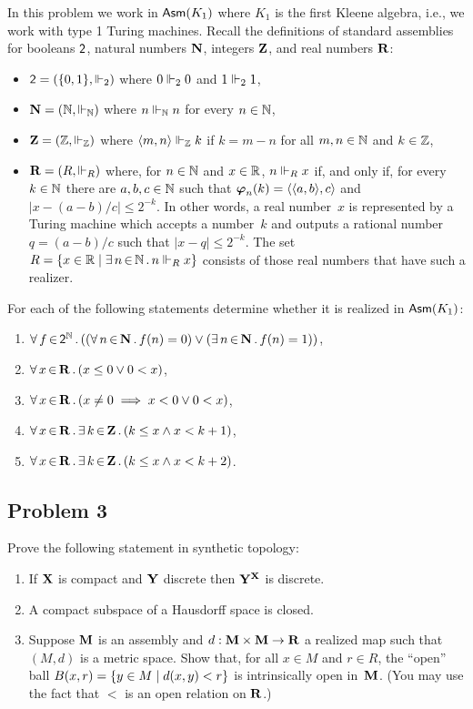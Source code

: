 \documentclass[a4paper,11pt]{article}
\begin{document}
In this problem we work in $\mathsf{Asm}(K_1)$ where $K_1$ is the first Kleene
algebra, i.e., we work with type 1 Turing machines. Recall the
definitions of standard assemblies for booleans $\mathsf{2}$, natural
numbers $\mathbf{N}$, integers $\mathbf{Z}$, and real numbers $\mathbf{R}$:
%
\begin{itemize}
\item $\mathsf{2} = (\{0,1\}, {\Vdash_2})$ where $0 \Vdash_2 0$ and
  $1 \Vdash_2 1$,
\item $\mathbf{N} = (\mathbb{N}, {\Vdash_{\mathbb{N}}})$ where $n \Vdash_{\mathbb{N}} n$ for every $n
  \in \mathbb{N}$,
\item $\mathbf{Z} = (\mathbb{Z}, {\Vdash_{\mathbb{Z}}})$ where $\langle m,n \rangle \Vdash_{\mathbb{Z}} k$ if $k
  = m - n$ for all $m, n \in \mathbb{N}$ and $k \in \mathbb{Z}$,
\item $\mathbf{R} = (R, {\Vdash_R})$ where, for $n \in \mathbb{N}$ and $x \in \mathbb{R}$,
  $n \Vdash_R x$ if, and only if, for every $k \in \mathbb{N}$ there are $a, b,
  c \in \mathbb{N}$ such that $\text{\boldmath{$\varphi$}}_{n}(k) = \langle \langle a, b \rangle, c \rangle$ and $|x -
  (a - b)/c| \leq 2^{-k}$. In other words, a real number~$x$ is
  represented by a Turing machine which accepts a number~$k$ and
  outputs a rational number $q = (a-b)/c$ such that $|x - q| \leq
  2^{-k}$. The set $R = \{x \in \mathbb{R} \mid \exists\, n \,{\in}\, \mathbb{N}\,.\,n \Vdash_R
      x\}$ consists of those real numbers that have such a realizer.
\end{itemize}
%
For each of the following statements determine whether it is realized
in $\mathsf{Asm}(K_1)$:
%
\begin{enumerate}
\item $\forall\, f \,{\in}\, \mathsf{2}^{\mathbb{N}}\,.\left((\forall\, n \,{\in}\, \mathbf{N}\,.\,f(n)=0) \lor
    (\exists\, n \,{\in}\, \mathbf{N}\,.\,f(n) = 1)\right)$,
\item $\forall\, x \,{\in}\, \mathbf{R}\,.\left(x \leq 0 \lor 0 < x\right)$,
\item $\forall\, x \,{\in}\, \mathbf{R}\,.\left(x \neq 0 \implies x < 0 \lor 0 < x\right)$,
\item $\forall\, x \,{\in}\, \mathbf{R}\,.\,\exists\, k \,{\in}\, \mathbf{Z}\,.\left(k \leq x \land x < k + 1\right)$,
\item $\forall\, x \,{\in}\, \mathbf{R}\,.\,\exists\, k \,{\in}\, \mathbf{Z}\,.\left(k \leq x \land x < k + 2\right)$.
\end{enumerate}
%

\subsection*{Problem 3}

Prove the following statement in synthetic topology:
%
\begin{enumerate}
\item If $\mathbf{X}$ is compact and $\mathbf{Y}$ discrete then
  $\mathbf{Y}^{\mathbf{X}}$ is discrete.
\item A compact subspace of a Hausdorff space is closed.
\item Suppose $\mathbf{M}$ is an assembly and $d : \mathbf{M} \times \mathbf{M}
  \to \mathbf{R}$ a realized map such that $(M, d)$ is a metric space.
  Show that, for all $x \in M$ and $r \in R$, the ``open'' ball
  $B(x,r) = \{y \in M \mid d(x,y) < r\}$ is intrinsically open
  in~$\mathbf{M}$. (You may use the fact that $<$ is an open relation on
  $\mathbf{R}$.)
\end{enumerate}
\end{document}
